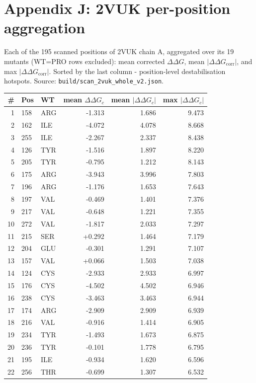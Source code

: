 \section*{Appendix J: 2VUK per-position aggregation}
Each of the 195 scanned positions of 2VUK chain A, aggregated over its 19
mutants (WT=PRO rows excluded): mean corrected $\Delta\Delta G$, mean
$|\Delta\Delta G_{\mathrm{corr}}|$, and max $|\Delta\Delta
G_{\mathrm{corr}}|$. Sorted by the last column - position-level
destabilisation hotspots. Source: \texttt{build/scan\_2vuk\_whole\_v2.json}.
\begin{longtable}{r l l r r r}
\hline
\# & Pos & WT & mean $\Delta\Delta G_c$ & mean $|\Delta\Delta G_c|$ & max $|\Delta\Delta G_c|$ \\ \hline
\endhead
1 & 158 & ARG & -1.313 & 1.686 & 9.473 \\
2 & 162 & ILE & -4.072 & 4.078 & 8.668 \\
3 & 255 & ILE & -2.267 & 2.337 & 8.438 \\
4 & 126 & TYR & -1.516 & 1.897 & 8.220 \\
5 & 205 & TYR & -0.795 & 1.212 & 8.143 \\
6 & 175 & ARG & -3.943 & 3.996 & 7.803 \\
7 & 196 & ARG & -1.176 & 1.653 & 7.643 \\
8 & 197 & VAL & -0.469 & 1.401 & 7.376 \\
9 & 217 & VAL & -0.648 & 1.221 & 7.355 \\
10 & 272 & VAL & -1.817 & 2.033 & 7.297 \\
11 & 215 & SER & +0.292 & 1.464 & 7.179 \\
12 & 204 & GLU & -0.301 & 1.291 & 7.107 \\
13 & 157 & VAL & +0.066 & 1.503 & 7.038 \\
14 & 124 & CYS & -2.933 & 2.933 & 6.997 \\
15 & 176 & CYS & -4.502 & 4.502 & 6.946 \\
16 & 238 & CYS & -3.463 & 3.463 & 6.944 \\
17 & 174 & ARG & -2.909 & 2.909 & 6.939 \\
18 & 216 & VAL & -0.916 & 1.414 & 6.905 \\
19 & 234 & TYR & -1.493 & 1.673 & 6.875 \\
20 & 236 & TYR & -0.101 & 1.778 & 6.795 \\
21 & 195 & ILE & -0.934 & 1.620 & 6.596 \\
22 & 256 & THR & -0.699 & 1.307 & 6.532 \\

\end{longtable}
